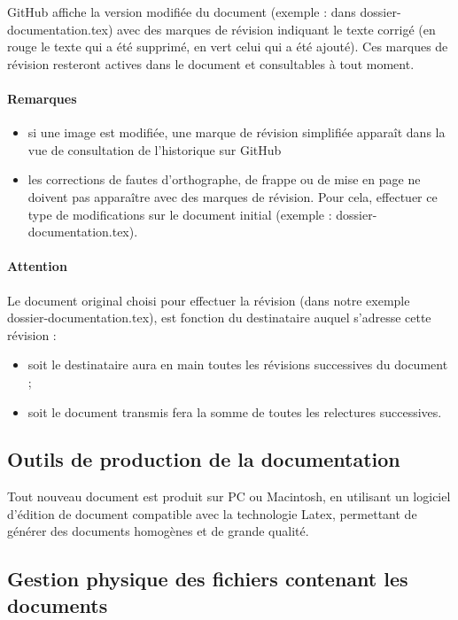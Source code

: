 \documentclass[a4paper]{article}
\begin{document}
GitHub affiche la version modifiée du document (exemple : dans dossier-documentation.tex) avec des marques de révision indiquant le texte corrigé (en rouge le texte qui a été supprimé, en vert celui qui a été ajouté). Ces marques de révision resteront actives dans le document et consultables à tout moment.

\paragraph{Remarques}

\begin{itemize}
\item si une image est modifiée, une marque de révision simplifiée apparaît dans la vue de consultation de l'historique sur GitHub
\item les corrections de fautes d'orthographe, de frappe ou de mise en page ne doivent pas apparaître avec des marques de révision. Pour cela, effectuer ce type de modifications sur le document initial (exemple : dossier-documentation.tex).
\end{itemize}

\paragraph{Attention} Le document original choisi pour effectuer la révision (dans notre exemple dossier-documentation.tex), est fonction du destinataire auquel s'adresse cette révision :

\begin{itemize}
\item soit le destinataire aura en main toutes les révisions successives du document ;
\item soit le document transmis fera la somme de toutes les relectures successives.
\end{itemize}


\subsection{Outils de production de la documentation}

Tout nouveau document est produit sur PC ou Macintosh, en utilisant un logiciel d'édition de document compatible avec la technologie Latex, permettant de générer des documents homogènes et de grande qualité.

\subsection{Gestion physique des fichiers contenant les documents}
\end{document}
